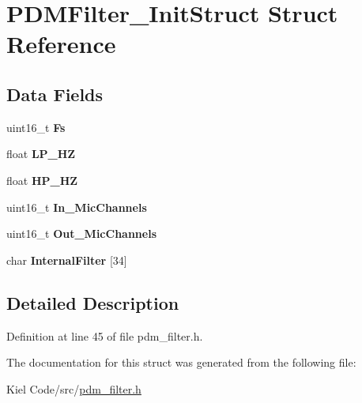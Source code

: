 \hypertarget{struct_p_d_m_filter___init_struct}{}\section{P\+D\+M\+Filter\+\_\+\+Init\+Struct Struct Reference}
\label{struct_p_d_m_filter___init_struct}
\subsection*{Data Fields}
\begin{DoxyCompactItemize}
\item 
\mbox{\label{struct_p_d_m_filter___init_struct_aab12d558180c4fd3be25fc538b9b4b10}} 
uint16\+\_\+t {\bfseries Fs}
\item 
\mbox{\label{struct_p_d_m_filter___init_struct_a4b4c022414b7cc762aa24d041d829359}} 
float {\bfseries L\+P\+\_\+\+HZ}
\item 
\mbox{\label{struct_p_d_m_filter___init_struct_ac36905754b6a43ff586fa1fef12e4c16}} 
float {\bfseries H\+P\+\_\+\+HZ}
\item 
\mbox{\label{struct_p_d_m_filter___init_struct_a7d30f10b18e345c4c5141727c3491788}} 
uint16\+\_\+t {\bfseries In\+\_\+\+Mic\+Channels}
\item 
\mbox{\label{struct_p_d_m_filter___init_struct_aa4e8e824f601a2ff15a5fa367b6477ab}} 
uint16\+\_\+t {\bfseries Out\+\_\+\+Mic\+Channels}
\item 
\mbox{\label{struct_p_d_m_filter___init_struct_ab2c7294dda7551e298c46289c9f2a5b4}} 
char {\bfseries Internal\+Filter} \mbox{[}34\mbox{]}
\end{DoxyCompactItemize}


\subsection{Detailed Description}


Definition at line 45 of file pdm\+\_\+filter.\+h.



The documentation for this struct was generated from the following file\+:\begin{DoxyCompactItemize}
\item 
Kiel Code/src/\mbox{\hyperlink{pdm__filter_8h}{pdm\+\_\+filter.\+h}}\end{DoxyCompactItemize}
